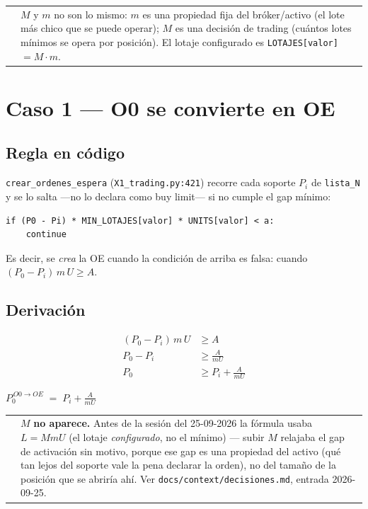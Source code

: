 \documentclass[11pt,a4paper]{article}
\makeatletter
\newcommand{\code}[1]{\texttt{\small #1}}
\newenvironment{nota}{%
  \par\medskip\noindent
  \begin{tabular}{@{}p{0.4em}@{\hspace{8pt}}p{\dimexpr\linewidth-2em\relax}@{}}
  \textcolor{cnaranja}{\rule{3pt}{1.1em}} &
}{\end{tabular}\par\medskip}
\makeatother
\begin{document}
\begin{nota}
$M$ y $m$ no son lo mismo: $m$ es una propiedad fija del bróker/activo (el lote más
chico que se puede operar); $M$ es una decisión de trading (cuántos lotes mínimos se
opera por posición). El lotaje configurado es \code{LOTAJES[valor]} $= M \cdot m$.
\end{nota}

\section{Caso 1 --- O0 se convierte en OE}

\subsection{Regla en código}

\code{crear\_ordenes\_espera} (\code{X1\_trading.py:421}) recorre cada soporte $P_i$ de
\code{lista\_N} y se lo salta —no lo declara como buy limit— si no cumple el gap
mínimo:

\begin{lstlisting}
if (P0 - Pi) * MIN_LOTAJES[valor] * UNITS[valor] < a:
    continue
\end{lstlisting}

Es decir, se \emph{crea} la OE cuando la condición de arriba es falsa: cuando
$(P_0 - P_i)\, m\, U \geq A$.

\subsection{Derivación}

\begin{align}
(P_0 - P_i)\, m\, U &\geq A \\
P_0 - P_i &\geq \frac{A}{mU} \\
P_0 &\geq P_i + \frac{A}{mU}
\end{align}

\begin{center}
\colorbox{cfondo}{$\displaystyle P_{0}^{\,O0\to OE} \;=\; P_i + \frac{A}{mU}$}
\end{center}

\begin{nota}
$M$ \textbf{no aparece.} Antes de la sesión del 25-09-2026 la fórmula usaba
$L = M m U$ (el lotaje \emph{configurado}, no el mínimo) — subir $M$ relajaba el gap de
activación sin motivo, porque ese gap es una propiedad del activo (qué tan lejos del
soporte vale la pena declarar la orden), no del tamaño de la posición que se abriría
ahí. Ver \code{docs/context/decisiones.md}, entrada 2026-09-25.
\end{nota}
\end{document}

